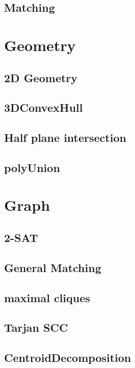 \subsection{Matching}


\section{Geometry}
\subsection{2D Geometry}

\subsection{3DConvexHull}

\subsection{Half plane intersection}

\subsection{polyUnion}




\section{Graph}
\subsection{2-SAT}

\subsection{General Matching}

\subsection{maximal cliques}

\subsection{Tarjan SCC}

\subsection{CentroidDecomposition}

